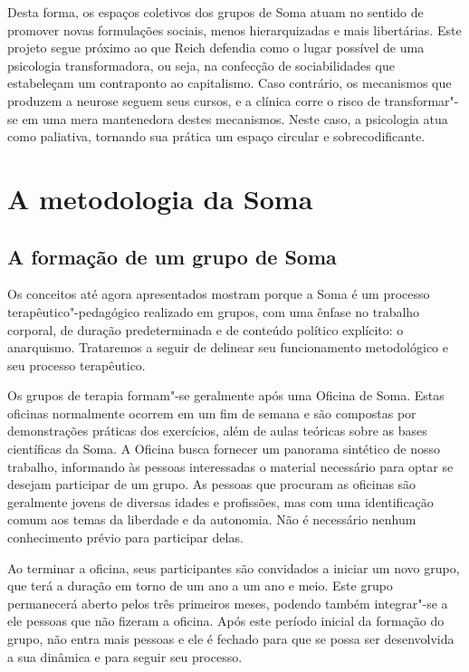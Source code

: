 Desta forma, os espaços coletivos dos grupos de Soma atuam no sentido de
promover novas formulações sociais, menos hierarquizadas e mais
libertárias. Este projeto segue próximo ao que Reich defendia como o
lugar possível de uma psicologia transformadora, ou seja, na confecção
de sociabilidades que estabeleçam um contraponto ao capitalismo. Caso
contrário, os mecanismos que produzem a neurose seguem seus cursos, e a
clínica corre o risco de transformar"-se em uma mera mantenedora destes
mecanismos. Neste caso, a psicologia atua como paliativa, tornando sua
prática um espaço circular e sobrecodificante.

\chapter{A metodologia da Soma}

\section{A formação de um grupo de Soma}

Os conceitos até agora apresentados mostram porque a Soma é um processo
terapêutico"-pedagógico realizado em grupos, com uma ênfase no trabalho
corporal, de duração predeterminada e de conteúdo político explícito: o
anarquismo. Trataremos a seguir de delinear seu funcionamento
metodológico e seu processo terapêutico.

Os grupos de terapia formam"-se geralmente após uma Oficina de Soma.
Estas oficinas normalmente ocorrem em um fim de semana e são compostas
por demonstrações práticas dos exercícios, além de aulas teóricas sobre
as bases científicas da Soma. A Oficina busca fornecer um panorama
sintético de nosso trabalho, informando às pessoas interessadas o
material necessário para optar se desejam participar de um grupo. As
pessoas que procuram as oficinas são geralmente jovens de diversas
idades e profissões, mas com uma identificação comum aos temas da
liberdade e da autonomia. Não é necessário nenhum conhecimento prévio
para participar delas.

Ao terminar a oficina, seus participantes são convidados a iniciar um
novo grupo, que terá a duração em torno de um ano a um ano e meio. Este
grupo permanecerá aberto pelos três primeiros meses, podendo também
integrar"-se a ele pessoas que não fizeram a oficina. Após este período
inicial da formação do grupo, não entra mais pessoas e ele é fechado
para que se possa ser desenvolvida a sua dinâmica e para seguir seu
processo.


